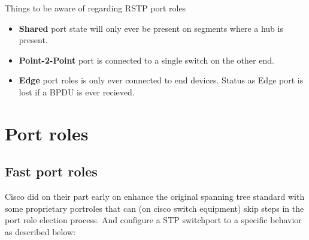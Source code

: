 Things to be aware of regarding RSTP port roles
\begin{itemize}
    \item \textbf{Shared} port state will only ever be present on segments where a hub is present.
    \item \textbf{Point-2-Point} port is connected to a single switch on the other end.
    \item \textbf{Edge} port roles is only ever connected to end devices. Status as Edge port is lost if a BPDU is ever recieved.
\end{itemize}


\section{Port roles}

\subsection{Fast port roles}
Cisco did on their part early on enhance the original spanning tree standard with some proprietary portroles that can (on cisco switch equipment) skip steps in the port role election process. And configure a STP switchport to a specific behavior as described below:

